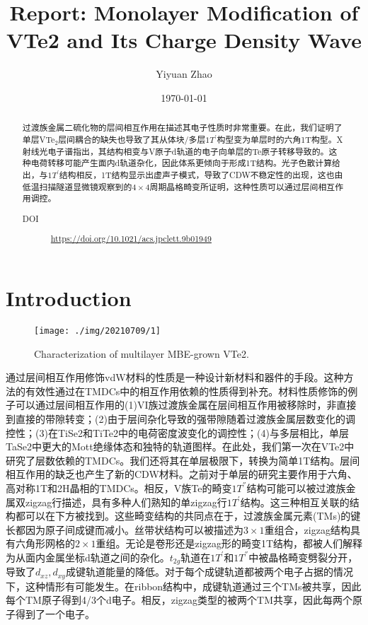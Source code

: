 \documentclass[reprint, aps, prb, showkeys]{revtex4-2}
\begin{document}
\title{Report: Monolayer Modification of VTe2 and Its Charge Density Wave}

\author{Yiyuan Zhao}
\date{\today}

\begin{abstract}
过渡族金属二硫化物的层间相互作用在描述其电子性质时非常重要。在此，我们证明了单层VTe$_2$层间耦合的缺失也导致了其从体块/多层$1T^{'}$构型变为单层时的六角1T构型。X射线光电子谱指出，其结构相变与V原子d轨道的电子向单层的Te原子转移导致的。这种电荷转移可能产生面内d轨道杂化，因此体系更倾向于形成1T结构。光子色散计算给出，与$1T^{'}$结构相反，1T结构显示出虚声子模式，导致了CDW不稳定性的出现，这也由低温扫描隧道显微镜观察到的$4 \times 4$周期晶格畸变所证明，这种性质可以通过层间相互作用调控。

\begin{description}
    \item[DOI] \url{https://doi.org/10.1021/acs.jpclett.9b01949}
\end{description}
\end{abstract}


\maketitle

\section{Introduction}
\begin{figure}[t]
    \texttt{[image: ./img/20210709/1]}
    \caption{\label{fig:STM} 
    Characterization of multilayer MBE-grown VTe2.
    }
\end{figure}
通过层间相互作用修饰vdW材料的性质是一种设计新材料和器件的手段。这种方法的有效性通过在TMDCs中的相互作用依赖的性质得到补充。材料性质修饰的例子可以通过层间相互作用的(1)VI族过渡族金属在层间相互作用被移除时，非直接到直接的带隙转变；(2)由于层间杂化导致的强带隙随着过渡族金属层数变化的调控性；(3)在TiSe2和TiTe2中的电荷密度波变化的调控性；(4)与多层相比，单层TaSe2中更大的Mott绝缘体态和独特的轨道图样。在此处，我们第一次在VTe2中研究了层数依赖的TMDCs。我们还将其在单层极限下，转换为简单1T结构。层间相互作用的缺乏也产生了新的CDW材料。之前对于单层的研究主要作用于六角、高对称1T和2H晶相的TMDCs。相反，V族Te的畸变$1T^{''}$结构可能可以被过渡族金属双zigzag行描述，具有多种人们熟知的单zigzag行$1T^{'}$结构。这三种相互关联的结构都可以在下方被找到。这些畸变结构的共同点在于，过渡族金属元素(TMs)的键长都因为原子间成键而减小。丝带状结构可以被描述为$3 \times 1$重组合，zigzag结构具有六角形网格的$2 \times 1$重组。无论是卷形还是zigzag形的畸变1T结构，都被人们解释为从面内金属坐标d轨道之间的杂化。$t_{2g}$轨道在$1T^{'}$和$1T^{''}$中被晶格畸变劈裂分开，导致了$d_{xz}, d_{xy}$成键轨道能量的降低。对于每个成键轨道都被两个电子占据的情况下，这种情形有可能发生。在ribbon结构中，成键轨道通过三个TMs被共享，因此每个TM原子得到4/3个d电子。相反，zigzag类型的被两个TM共享，因此每两个原子得到了一个电子。
\end{document}

